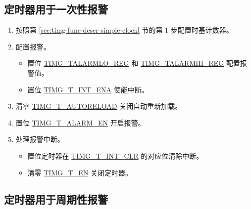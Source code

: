 \documentclass[main\_\_CN.tex]{subfiles}
\begin{document}
\subsection{定时器用于一次性报警}\label{sec:timg-func-descr-timer-alarm}
\begin{enumerate}
    \item 按照第 \ref{sec:timg-func-descr-simple-clock} 节的第 1 步配置时基计数器。
    \item 配置报警。
    \begin{itemize}
        \item 置位 \hyperref[regdesc:TIMGTXALARMLOREG]{TIMG\_TALARMLO\_REG} 和 \hyperref[regdesc:TIMGTXALARMHIREG]{TIMG\_TALARMHI\_REG} 配置报警值。
        \item 置位 \hyperref[fielddesc:TIMGTXINTENA]{TIMG\_T\_INT\_ENA} 使能中断。
    \end{itemize}
    \item 清零 \hyperref[fielddesc:TIMGTXAUTORELOAD]{TIMG\_T\_AUTORELOAD} 关闭自动重新加载。
    \item 置位 \hyperref[fielddesc:TIMGTXALARMEN]{TIMG\_T\_ALARM\_EN} 开启报警。
    \item 处理报警中断。
    \begin{itemize}
        \item 置位定时器在 \hyperref[fielddesc:TIMGTXINTCLR]{TIMG\_T\_INT\_CLR} 的对应位清除中断。
        \item 清零 \hyperref[fielddesc:TIMGTXEN]{TIMG\_T\_EN} 关闭定时器。
    \end{itemize}
\end{enumerate}

\subsection{定时器用于周期性报警}
\end{document}
